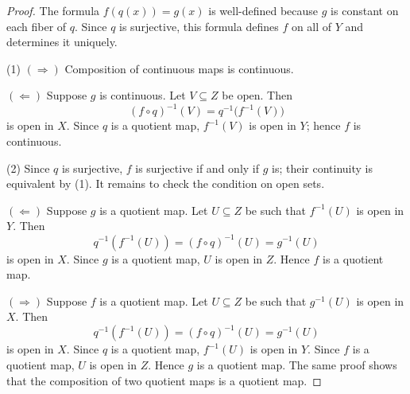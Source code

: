 \begin{center}
\end{center}


\begin{proof}
The formula $f(q(x))=g(x)$ is well-defined because $g$ is constant on each fiber of $q$. Since $q$ is surjective, this formula defines $f$ on all of $Y$ and determines it uniquely.

(1) $(\Rightarrow)$ Composition of continuous maps is continuous.

$(\Leftarrow)$ Suppose $g$ is continuous. Let $V\subseteq Z$ be open. Then
\[
(f\circ q)^{-1}(V)=q^{-1}\bigl(f^{-1}(V)\bigr)
\]
is open in $X$. Since $q$ is a quotient map, $f^{-1}(V)$ is open in $Y$; hence $f$ is continuous.


(2) Since $q$ is surjective, $f$ is surjective if and only if $g$ is; their continuity is equivalent by (1). It remains to check the condition on open sets.

$(\Leftarrow)$ Suppose $g$ is a quotient map. Let $U\subseteq Z$ be such that $f^{-1}(U)$ is open in $Y$. Then
\[q^{-1}(f^{-1}(U))=(f\circ q)^{-1}(U)=g^{-1}(U)\]
is open in $X$. Since $g$ is a quotient map, $U$ is open in $Z$. Hence $f$ is a quotient map.

$(\Rightarrow)$ Suppose $f$ is a quotient map. Let $U\subseteq Z$ be such that $g^{-1}(U)$ is open in $X$. Then
\[q^{-1}(f^{-1}(U))=(f\circ q)^{-1}(U)=g^{-1}(U)\]
is open in $X$. Since $q$ is a quotient map, $f^{-1}(U)$ is open in $Y$. Since $f$ is a quotient map, $U$ is open in $Z$. Hence $g$ is a quotient map. The same proof shows that the composition of two quotient maps is a quotient map.
\end{proof}



